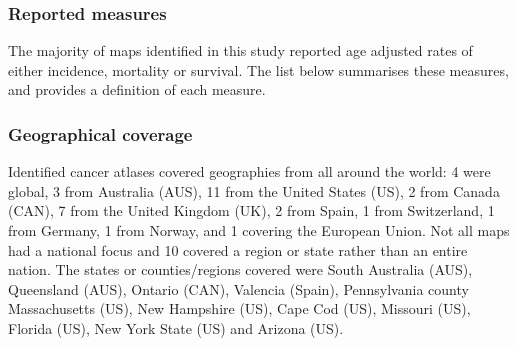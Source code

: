 \documentclass[11pt,]{article}
\begin{document}
\hypertarget{reported-measures}{%
\subsubsection*{Reported measures}\label{reported-measures}}

The majority of maps identified in this study reported age adjusted
rates of either incidence, mortality or survival. The list below
summarises these measures, and provides a definition of each measure.

\hypertarget{geographical-coverage}{%
\subsubsection*{Geographical coverage}\label{geographical-coverage}}

Identified cancer atlases covered geographies from all around the world:
4 were global, 3 from Australia (AUS), 11 from the United States (US), 2
from Canada (CAN), 7 from the United Kingdom (UK), 2 from Spain, 1 from
Switzerland, 1 from Germany, 1 from Norway, and 1 covering the European
Union. Not all maps had a national focus and 10 covered a region or
state rather than an entire nation. The states or counties/regions
covered were South Australia (AUS), Queensland (AUS), Ontario (CAN),
Valencia (Spain), Pennsylvania county Massachusetts (US), New Hampshire
(US), Cape Cod (US), Missouri (US), Florida (US), New York State (US)
and Arizona (US).

\newpage
\end{document}
